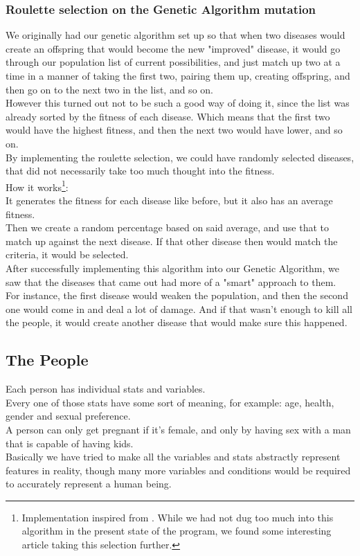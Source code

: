 \documentclass[conference,compsoc]{IEEEtran}
\begin{document}
\subsubsection{Roulette selection on the Genetic Algorithm mutation} 
We originally had our genetic algorithm set up so that when two diseases would create an offspring that would become the new "improved" disease, it would go through our population list of current possibilities, and just match up two at a time in a manner of taking the first two, pairing them up, creating offspring, and then go on to the next two in the list, and so on.\\
However this turned out not to be such a good way of doing it, since the list was already sorted by the fitness of each disease. Which means that the first two would have the highest fitness, and then the next two would have lower, and so on.\\
By implementing the roulette selection, we could have randomly selected diseases, that did not necessarily take too much thought into the fitness.\\

How it works\footnote{Implementation inspired from \cite{rsImplementation}. While we had not dug too much into this algorithm in the present state of the program, we found some interesting article \cite{slowik2004modified} taking this selection further.}:\\
It generates the fitness for each disease like before, but it also has an average fitness.\\
Then we create a random percentage based on said average, and use that to match up against the next disease. If that other disease then would match the criteria, it would be selected.\\
After successfully implementing this algorithm into our Genetic Algorithm, we saw that the diseases that came out had more of a "smart" approach to them.\\
For instance, the first disease would weaken the population, and then the second one would come in and deal a lot of damage. And if that wasn't enough to kill all the people, it would create another disease that would make sure this happened.\\

\subsection{The People}
Each person has individual stats and variables.\\
Every one of those stats have some sort of meaning, for example: age, health, gender and sexual preference.\\
A person can only get pregnant if it's female, and only by having sex with a man that is capable of having kids.\\
Basically we have tried to make all the variables and stats abstractly represent features in reality, though many more variables and conditions would be required to accurately represent a human being.\\
\end{document}

